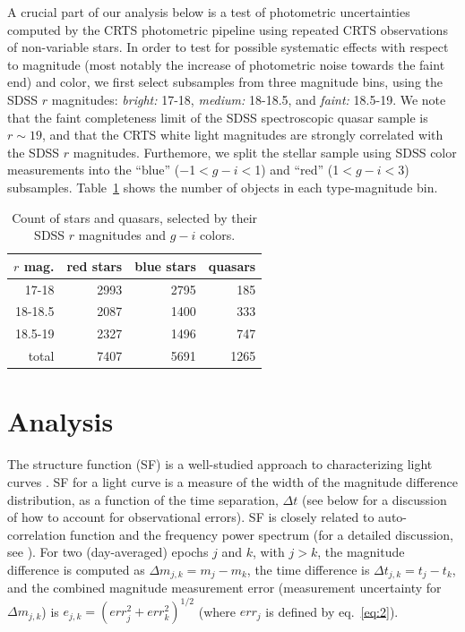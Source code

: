 \documentclass[fleqn,usenatbib]{mnras}  %
\begin{document}
A crucial part of our analysis below is a test of photometric uncertainties computed by the CRTS photometric
pipeline using repeated CRTS observations of non-variable stars. In order to test for possible systematic
effects with respect to magnitude (most notably the increase of photometric noise towards
the faint end) and color, we first select  subsamples from three magnitude bins, using the SDSS $r$ magnitudes: 
{\it bright:} 17-18,  {\it medium:} 18-18.5, and {\it faint:} 18.5-19. We note that the faint completeness limit 
of the SDSS spectroscopic quasar sample is $r\sim19$, and that the CRTS white light magnitudes are strongly
correlated with the SDSS $r$ magnitudes. Furthemore, we split the stellar sample using SDSS color measurements
into the ``blue'' ($-$1$<g-i<$1) and ``red'' (1$<g-i<$3) subsamples. Table~\ref{tab:object_count} shows the 
number of objects in each type-magnitude bin.  

\begin{table}
\centering
\caption{Count of stars and quasars, selected by their SDSS $r$ magnitudes and $g-i$ colors.}
\label{tab:object_count}
\begin{tabular}{ r|rrr } 
\hline
$r$ mag.  & red stars & blue stars & quasars \\ 
\hline
17-18   & 2993 & 2795   & 185    \\ 
18-18.5 & 2087 &  1400  & 333   \\ 
18.5-19 & 2327 &  1496  & 747   \\
\hline
total       & 7407 &  5691 & 1265 
\end{tabular}
\end{table}
 


\section{Analysis}
\label{sec:analysis}

The structure function (SF) is a well-studied approach to characterizing light curves \citep{2004Ivezic, berk2004, devries2005, macleod2010, graham2013, kozlowski2016}. SF for a light curve is a measure of the width of the magnitude difference distribution, as a function of
the time separation, $\Delta t$ (see below for a discussion of how to account for observational errors). SF is closely related to auto-correlation
function and the frequency power spectrum (for a detailed discussion,  see \citealt{ivezic2014}). For two (day-averaged) epochs $j$ and $k$, 
with $j > k$, the magnitude difference is computed as $\Delta m_{j,k} = m_{j} - m_{k}$, the time difference is  $\Delta t_{j,k} = t_{j} - t_{k}$, and 
the combined magnitude measurement error (measurement uncertainty for $\Delta m_{j,k}$) is $e_{j,k} = (err_{j}^{2} + err_{k}^{2})^{1/2}$ (where 
$err_{j}$ is defined by eq.~\ref{eq:2}). 
\end{document}

